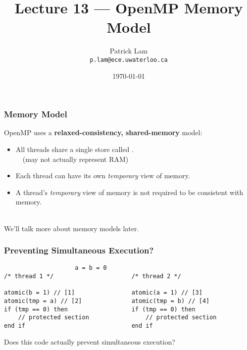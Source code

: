

\title{Lecture 13 --- OpenMP Memory Model }

\author{Patrick Lam \\ \small \texttt{p.lam@ece.uwaterloo.ca}}
\date{\today}




\begin{frame}
  \titlepage

 \end{frame}

\begin{frame}
  \frametitle{Memory Model}

  

  OpenMP uses a {\bf relaxed-consistency, shared-memory} model:

  \begin{itemize}
    \item All threads share a single store called
      .\\ ~~(may not actually represent RAM)\\[1em]
    \item Each thread can have its own {\it temporary} view of memory.\\[1em]
    \item A thread's {\it temporary} view of memory is not required to be
      consistent with memory.
  \end{itemize}~\\

  We'll talk more about memory models later.
  
\end{frame}

\begin{frame}[fragile]
  \frametitle{Preventing Simultaneous Execution?}

  \begin{lstlisting}
                    a = b = 0
/* thread 1 */                      /* thread 2 */

atomic(b = 1) // [1]                atomic(a = 1) // [3]
atomic(tmp = a) // [2]              atomic(tmp = b) // [4]
if (tmp == 0) then                  if (tmp == 0) then
    // protected section                // protected section
end if                              end if
  \end{lstlisting}

  
 Does this code actually prevent simultaneous execution?
  
\end{frame}

